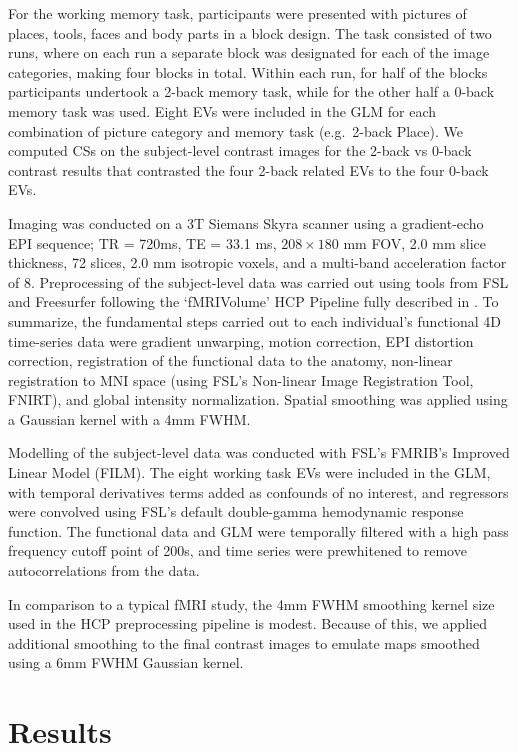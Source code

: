 For the working memory task, participants were presented with pictures of places, tools, faces and body parts in a block design. The task consisted of two runs, where on each run a separate block was designated for each of the image categories, making four blocks in total. Within each run, for half of the blocks participants undertook a 2-back memory task, while for the other half a 0-back memory task was used. Eight EVs were included in the GLM for each combination of picture category and memory task (e.g.\ 2-back Place). We computed CSs on the subject-level contrast images for the 2-back vs 0-back contrast results that contrasted the four 2-back related EVs to the four 0-back EVs.

Imaging was conducted on a 3T Siemans Skyra scanner using a gradient-echo EPI sequence; TR = 720ms, TE = 33.1 ms, $208\times180$ mm FOV, 2.0 mm slice thickness, 72 slices, 2.0 mm isotropic voxels, and a multi-band acceleration factor of 8. Preprocessing of the subject-level data was carried out using tools from FSL and Freesurfer following the `fMRIVolume' HCP Pipeline fully described in \citet{Glasser2013-qc}. To summarize, the fundamental steps carried out to each individual's functional 4D time-series data were gradient unwarping, motion correction, EPI distortion correction, registration of the functional data to the anatomy, non-linear registration to MNI space (using FSL's Non-linear Image Registration Tool, FNIRT), and global intensity normalization. Spatial smoothing was applied using a Gaussian kernel with a 4mm FWHM. 

Modelling of the subject-level data was conducted with FSL's FMRIB's Improved Linear Model (FILM). The eight working task EVs were included in the GLM, with temporal derivatives terms added as confounds of no interest, and regressors were convolved using FSL's default double-gamma hemodynamic response function. The functional data and GLM were temporally filtered with a high pass frequency cutoff point of 200s, and time series were prewhitened to remove autocorrelations from the data.

In comparison to a typical fMRI study, the 4mm FWHM smoothing kernel size used in the HCP preprocessing pipeline is modest. Because of this, we applied additional smoothing to the final contrast images to emulate maps smoothed using a 6mm FWHM Gaussian kernel.

\section{Results}
\label{sec:Results}
